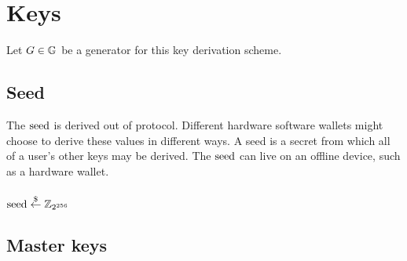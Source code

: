 \section{Keys}
\label{sec:keys}

Let $G \in \G$ be a generator for this key derivation scheme.


\subsection{Seed}
The $\seed$ is derived out of protocol.
Different hardware \/ software wallets might choose to derive these values in different ways.
A seed is a secret from which all of a user's other keys may be derived.
The $\seed$ can live on an offline device, such as a hardware wallet.\\
\\ 
$\seed \stackrel{\$}{\leftarrow} \mathbb{Z}_{2^{256}}$\\


\subsection{Master keys}

